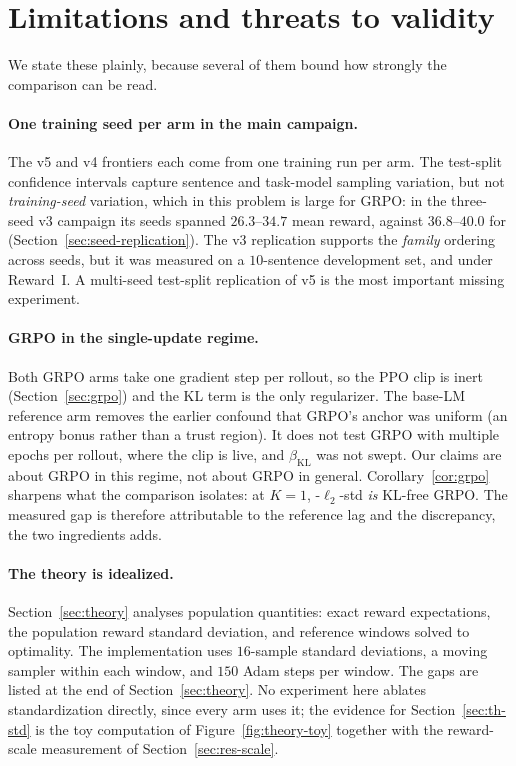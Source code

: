 \section{Limitations and threats to validity}
\label{sec:limitations}

We state these plainly, because several of them bound how strongly the
comparison can be read.

\paragraph{One training seed per arm in the main campaign.}
The v5 and v4 frontiers each come from one training run per arm. The test-split confidence
intervals capture sentence and task-model sampling variation, but not
\emph{training-seed} variation, which in this problem is large for GRPO: in the
three-seed v3 campaign its seeds spanned $26.3$--$34.7$ mean reward, against
$36.8$--$40.0$ for \rrebel{} (Section~\ref{sec:seed-replication}). The v3
replication supports the \emph{family} ordering across seeds, but it was
measured on a $10$-sentence development set, and under Reward~I. A
multi-seed test-split replication of v5 is the most important missing
experiment.

\paragraph{GRPO in the single-update regime.}
Both GRPO arms take one gradient step per rollout, so the PPO clip is inert
(Section~\ref{sec:grpo}) and the KL term is the only regularizer. The base-LM
reference arm removes the earlier confound that GRPO's anchor was uniform (an
entropy bonus rather than a trust region). It does not test GRPO with multiple
epochs per rollout, where the clip is live, and $\beta_{\mathrm{KL}}$ was not
swept. Our claims are about GRPO in this regime, not about GRPO in general.
Corollary~\ref{cor:grpo} sharpens what the comparison isolates: at $K=1$,
\rrebel{}-$\ell_2$-std \emph{is} KL-free GRPO. The measured gap is therefore
attributable to the reference lag and the discrepancy, the two ingredients
\rrebel{} adds.

\paragraph{The theory is idealized.}
Section~\ref{sec:theory} analyses population quantities: exact reward
expectations, the population reward standard deviation, and reference windows
solved to optimality. The implementation uses $16$-sample standard deviations,
a moving sampler within each window, and $150$ Adam steps per window. The gaps
are listed at the end of Section~\ref{sec:theory}. No experiment here ablates
standardization directly, since every \rrebel{} arm uses it; the evidence for
Section~\ref{sec:th-std} is the toy computation of
Figure~\ref{fig:theory-toy} together with the reward-scale measurement of
Section~\ref{sec:res-scale}.

